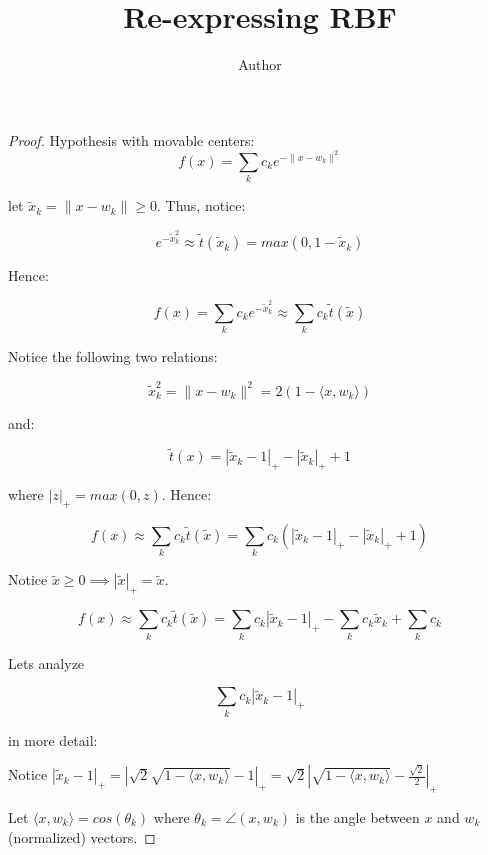 \documentclass[12pt]{article}
\begin{document}
 
 
\title{Re-expressing RBF }
\author{Author}
\maketitle
 
\begin{proof}
Hypothesis with movable centers: 
$$f(x) = \sum_k c_k e^{ -\| x - w_k\|^2 }$$

let $\tilde{x}_k = \| x - w_k\| \geq 0 $. Thus, notice:

 $$ e^{ - \tilde{x}_k ^2 } \approx \tilde{t}( \tilde{x}_k) = max(0, 1 - \tilde{x}_k) $$
 
 Hence:
 
 $$ f(x) = \sum_k c_k e^{ -\tilde{x}_k^2 } \approx \sum_k c_k \tilde{t}( \tilde{x} ) $$
 
 Notice the following two relations:
 
 $$ \tilde{x}^2_k = \| x - w_k\|^2 = 2(1 - \langle x, w_k \rangle )$$
 
and:

$$ \tilde{t}(x) = | \tilde{x}_k - 1 |_+ - | \tilde{x}_k |_+ + 1$$

where $|z|_+ = max(0, z)$. Hence:

$$f(x) \approx  \sum_k c_k \tilde{t}( \tilde{x} ) = \sum_k c_k (| \tilde{x}_k - 1 |_+ - | \tilde{x}_k |_+ + 1)$$

Notice $\tilde{x} \geq 0 \implies | \tilde{x} |_+ = \tilde{x}$. 

$$f(x) \approx  \sum_k c_k \tilde{t}( \tilde{x} ) = \sum_k c_k | \tilde{x}_k - 1 |_+ - \sum_k c_k \tilde{x}_k  + \sum_k c_k$$

Lets analyze 

\begin{equation}
\label{interesting_rectifier}
\sum_k c_k | \tilde{x}_k - 1 |_+
\end{equation}

in more detail:

Notice $| \tilde{x}_k - 1 |_+ =  | \sqrt{2} \sqrt{1 - \langle x, w_k \rangle} - 1 |_+ = \sqrt{2} | \sqrt{1 - \langle x, w_k \rangle} - \frac{\sqrt{2}}{2}|_+$

Let $\langle x, w_k \rangle = cos(\theta_k)$ where $\theta_k = \angle(x, w_k) $ is the angle between $x$ and $w_k$ (normalized) vectors.


\end{proof}
\end{document}
